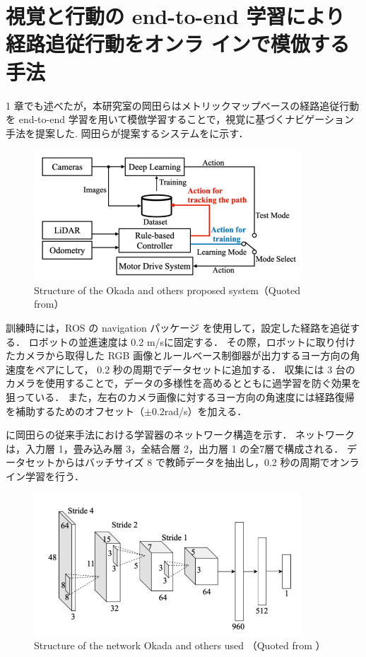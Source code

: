 \section{視覚と行動の end-to-end 学習により経路追従行動をオンラ
インで模倣する手法}
1 章でも述べたが，本研究室の岡田ら\cite{okada2020}はメトリックマップベースの経路追従行動を end-to-end 学習を用いて模倣学習することで，視覚に基づくナビゲーション手法を提案した.
岡田らが提案するシステムをに示す．

\begin{figure}[htbp]
  \centering
   \includegraphics[width=100mm]{images/pdf/okada/method_sys.pdf}
   \caption[Structure of the Okada and others proposed system]{Structure of the Okada and others proposed system（Quoted from\cite{okada2020}）}
   \label{fig:okada_sys}
\end{figure}

訓練時には，ROS の navigation パッケージ \cite{ros}を使用して，設定した経路を追従する．
ロボットの並進速度は 0.2 m/sに固定する．
その際，ロボットに取り付けたカメラから取得した RGB 画像とルールベース制御器が出力するヨー方向の角速度をペアにして， 0.2 秒の周期でデータセットに追加する．
収集には 3 台のカメラを使用することで，データの多様性を高めるとともに過学習を防ぐ効果を狙っている．
また，左右のカメラ画像に対するヨー方向の角速度には経路復帰を補助するためのオフセット（\(\pm 0.2\)rad/s）を加える．

\newpage
{}に岡田らの従来手法における学習器のネットワーク構造を示す．
ネットワークは，入力層 1，畳み込み層 3，全結合層 2，出力層 1 の全7層で構成される．
データセットからはバッチサイズ 8 で教師データを抽出し，0.2 秒の周期でオンライン学習を行う．

\begin{figure}[htbp]
    \centering
     \includegraphics[width=100mm]{images/pdf/okada/network.pdf}
     \caption[Structure of the network Okada and others used]{Structure of the network Okada and others used （Quoted from \cite{okada2020}）}
     \label{fig:okada_net}
\end{figure}

